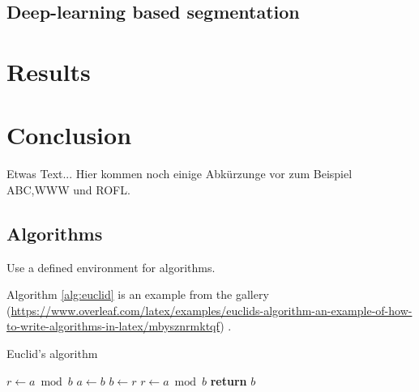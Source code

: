 \documentclass[Master,MDS,english]{BASE/twbook} %
\begin{document}
\section{Deep-learning based segmentation}



\chapter{Results} %





\chapter{Conclusion} %





Etwas Text... Hier kommen noch einige Abkürzunge vor zum Beispiel \ac{ABC},\ac{WWW} und \ac{ROFL}.


\section{Algorithms}


Use a defined environment for algorithms.

Algorithm \ref{alg:euclid} is an example from the gallery (\url{https://www.overleaf.com/latex/examples/euclids-algorithm-an-example-of-how-to-write-algorithms-in-latex/mbysznrmktqf}) .
\begin{algorithm}
\caption{Euclid’s algorithm}\label{alg:euclid}
\begin{algorithmic}[1]
\State $r\gets a\bmod b$
\State $a\gets b$
\State $b\gets r$
\State $r\gets a\bmod b$
\EndWhile\label{euclidendwhile}
\State \textbf{return} $b$
\EndProcedure
\end{algorithmic}
\end{algorithm}
\clearpage                                                       %

\end{document}

